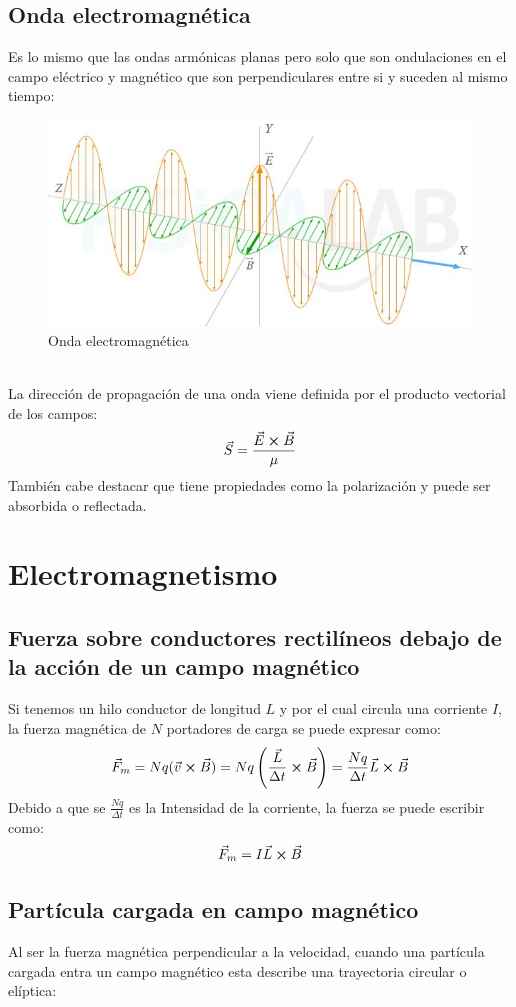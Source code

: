 \documentclass[arial,a4paper,print]{article}
\begin{document}
\subsection{Onda electromagnética}
Es lo mismo que las ondas armónicas planas pero solo que son ondulaciones en el campo eléctrico y magnético que son perpendiculares entre si y suceden al mismo tiempo:
\begin{figure}[h]
	\centering
	\includegraphics[width=0.4\linewidth]{figures/sintesis-electromagnetica}
	\caption{Onda electromagnética}
	\label{fig:sintesis-electromagnetica}
\end{figure}
\\
La dirección de propagación de una onda viene definida por el producto vectorial de los campos:
\begin{equation*}
	\vec{S} = \frac{\vec{E}\cross\vec{B}}{\mu}
\end{equation*}
También cabe destacar que tiene propiedades como la polarización y puede ser absorbida o reflectada. 


\section{Electromagnetismo}
\subsection{Fuerza sobre conductores rectilíneos debajo de la acción de un campo magnético}
Si tenemos un hilo conductor de longitud $L$ y por el cual circula una corriente $I$, la fuerza magnética de $N$ portadores de carga se puede expresar como:
\begin{equation*}
	\vec{F}_{m} = Nq(\vec{v}\cross\vec{B}) = Nq\left(\frac{\vec{L}}{\Delta t}\cross\vec{B}\right) = \frac{Nq}{\Delta t}\vec{L}\cross\vec{B}
\end{equation*}
Debido a que se $\frac{Nq}{\Delta t}$ es la Intensidad de la corriente, la fuerza se puede escribir como:
\begin{equation*}
	\vec{F}_{m} = I\vec{L}\cross\vec{B}
\end{equation*}

\subsection{Partícula cargada en campo magnético}
Al ser la fuerza magnética perpendicular a la velocidad, cuando una partícula cargada entra un campo magnético esta describe una trayectoria circular o elíptica: 
\end{document}
